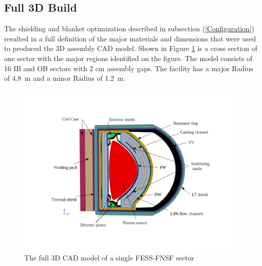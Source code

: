 \documentclass[12pt, letterpaper]{elsarticle}
\begin{document}
\subsection{Full 3D Build} \label{Full 3D Build}
The shielding and blanket optimization described in subsection (\ref{Configuration}) resulted in a full definition of the major materials and dimensions that were used to produced the 3D assembly CAD model. Shown in Figure \ref{fig:Full3D} is a cross section of one sector with the major regions identified on the figure. The model consists of 16 IB and OB sectors with 2 cm assembly gaps. The facility has a major Radius of \SI{4.8}{m} and a minor Radius of \SI{1.2}{m}.
\begin{figure}[h!]
  \centering
  \includegraphics[scale=0.35]{../plots/full_3d.png}
  \caption{The full 3D CAD model of a single FESS-FNSF sector}
  \label{fig:Full3D}
\end{figure}
\end{document}
